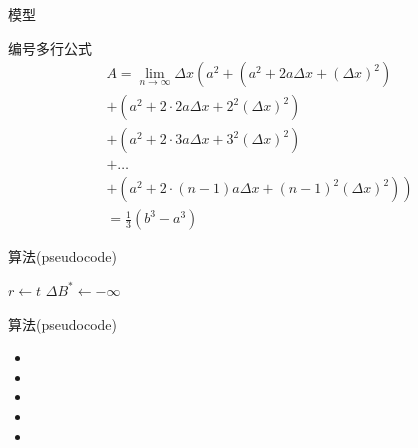 \documentclass[10pt,aspectratio=169,]{beamer}
\begin{document}
\begin{frame}{模型}
	\begin{alertblock}{编号多行公式}
		\begin{multline}
			A=\lim_{n\rightarrow\infty}\Delta x\left(a^{2}+\left(a^{2}+2a\Delta x+\left(\Delta x\right)^{2}\right)\right.\label{eq:reset}\\
			+\left(a^{2}+2\cdot2a\Delta x+2^{2}\left(\Delta x\right)^{2}\right)\\
			+\left(a^{2}+2\cdot3a\Delta x+3^{2}\left(\Delta x\right)^{2}\right)\\
			+\ldots\\
			\left.+\left(a^{2}+2\cdot(n-1)a\Delta x+(n-1)^{2}\left(\Delta x\right)^{2}\right)\right)\\
			=\frac{1}{3}\left(b^{3}-a^{3}\right)
		\end{multline}
	\end{alertblock}
\end{frame}

\begin{frame}{算法(pseudocode)}
\begin{algorithm}[H]
    \caption{Simulation-optimization heuristic}\label{algorithm}
    $r\leftarrow t$\;
    $\Delta B^{\ast}\leftarrow -\infty$\;
\end{algorithm}
\end{frame}

\begin{frame}{算法(pseudocode)}
    \begin{itemize}[<+->]
        \item {}
        \item {}
        \item {}
        \item {}
        \item {}
    \end{itemize}
\end{frame}
    
\end{document}
